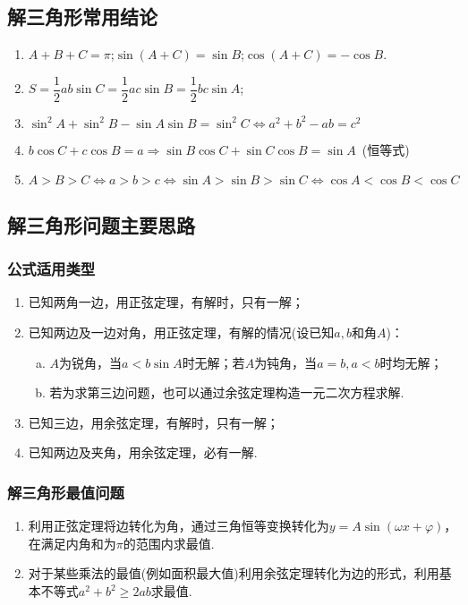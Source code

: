 \documentclass{BHCexam}
\begin{document}
\subsection{解三角形常用结论}
\begin{enumerate}[1)]
\item $A+B+C=\pi$;\quad $\sin\left(A+C\right)=\sin B$;\quad $\cos\left(A+C\right)=-\cos B$.
\item $S=\dfrac{1}{2}ab\sin C=\dfrac{1}{2}ac\sin B=\dfrac{1}{2}bc\sin A$;
\item $ \sin^2A+\sin^2B-\sin A\sin B=\sin^2C \Leftrightarrow a^2+b^2-ab=c^2$
\item $b\cos C+c\cos B=a\Rightarrow \sin B\cos C+\sin C\cos B=\sin A$~(恒等式)
\item $A>B>C\Leftrightarrow a>b>c\Leftrightarrow \sin A>\sin B>\sin C\Leftrightarrow \cos A<\cos B<\cos C$
\end{enumerate}

\subsection{解三角形问题主要思路}
\subsubsection{公式适用类型}
\begin{enumerate}[1)]
\item 已知两角一边，用正弦定理，有解时，只有一解；
\item 已知两边及一边对角，用正弦定理，有解的情况(设已知$ a,b $和角$ A $)：\begin{enumerate}[a)]
\item $ A $为锐角，当$ a<b\sin A $时无解；若$ A $为钝角，当$ a=b,a<b $时均无解；
\item 若为求第三边问题，也可以通过余弦定理构造一元二次方程求解.
\end{enumerate}
\item 已知三边，用余弦定理，有解时，只有一解；
\item 已知两边及夹角，用余弦定理，必有一解.
\end{enumerate}
\subsubsection{解三角形最值问题}
\begin{enumerate}[(1)]
\item 利用正弦定理将边转化为角，通过三角恒等变换转化为$ y=A\sin\left(\omega x+\varphi\right) $，在满足内角和为$ \pi $的范围内求最值.
\item 对于某些乘法的最值(例如面积最大值)利用余弦定理转化为边的形式，利用基本不等式$ a^2+b^2\ge2ab $求最值.
\end{enumerate}

\end{document}
